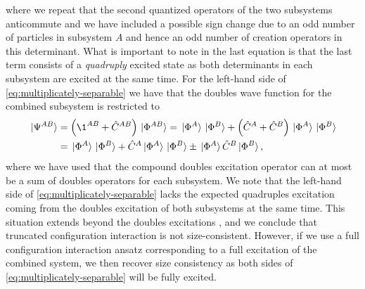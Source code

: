             where we repeat that the second quantized operators of the two
            subsystems anticommute and we have included a possible sign change due
            to an odd number of particles in subsystem $A$ and hence an odd
            number of creation operators in this determinant.
            What is important to note in the last equation is that the last term
            consists of a \emph{quadruply} excited state as both determinants in
            each subsystem are excited at the same time.
            For the left-hand side of \autoref{eq:multiplicately-separable} we
            have that the doubles wave function for the combined subsystem is
            restricted to
            \begin{align}
                \ket*{\Psi^{AB}}
                &= \para{\1^{AB} + \hat{C}^{AB}}\ket*{\slat^{AB}}
                = \ket*{\slat^{A}}\ket*{\slat^{B}}
                + \para{\hat{C}^{A} + \hat{C}^{B}}
                \ket*{\slat^{A}}\ket*{\slat^{B}}
                \\
                &=
                \ket*{\slat^{A}}\ket*{\slat^{B}}
                + \hat{C}^{A}\ket*{\slat^{A}}\ket*{\slat^{B}}
                \pm \ket*{\slat^{A}}\hat{C}^{B}\ket*{\slat^{B}},
            \end{align}
            where we have used that the compound doubles excitation operator can
            at most be a sum of doubles operators for each subsystem.
            We note that the left-hand side of
            \autoref{eq:multiplicately-separable} lacks the expected quadruples
            excitation coming from the doubles excitation of both subsystems at
            the same time.
            This situation extends beyond the doubles excitations
            \cite{size-extensivity}, and we conclude that truncated
            configuration interaction is not size-consistent.
            However, if we use a full configuration interaction ansatz
            corresponding to a full excitation of the combined system, we then
            recover size consistency as both sides of
            \autoref{eq:multiplicately-separable} will be fully excited.

